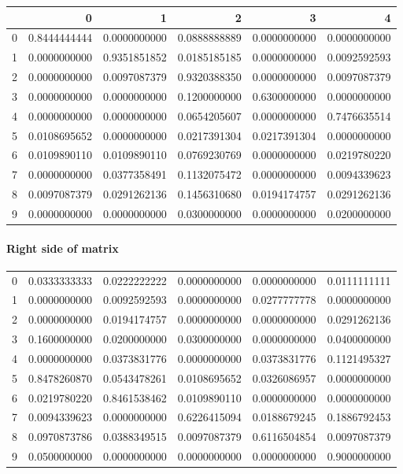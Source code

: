 \begin{tabular}{l|r|r|r|r|r}
 & 0 & 1 & 2 & 3 & 4 \\
\hline
0 & 0.8444444444 & 0.0000000000 & 0.0888888889 & 0.0000000000 & 0.0000000000 \\
1 & 0.0000000000 & 0.9351851852 & 0.0185185185 & 0.0000000000 & 0.0092592593 \\
2 & 0.0000000000 & 0.0097087379 & 0.9320388350 & 0.0000000000 & 0.0097087379 \\
3 & 0.0000000000 & 0.0000000000 & 0.1200000000 & 0.6300000000 & 0.0000000000 \\
4 & 0.0000000000 & 0.0000000000 & 0.0654205607 & 0.0000000000 & 0.7476635514 \\
5 & 0.0108695652 & 0.0000000000 & 0.0217391304 & 0.0217391304 & 0.0000000000 \\
6 & 0.0109890110 & 0.0109890110 & 0.0769230769 & 0.0000000000 & 0.0219780220 \\
7 & 0.0000000000 & 0.0377358491 & 0.1132075472 & 0.0000000000 & 0.0094339623 \\
8 & 0.0097087379 & 0.0291262136 & 0.1456310680 & 0.0194174757 & 0.0291262136 \\
9 & 0.0000000000 & 0.0000000000 & 0.0300000000 & 0.0000000000 & 0.0200000000 \\
\end{tabular}

\paragraph{Right side of matrix}

\begin{tabular}{l|r|r|r|r|r}
0 & 0.0333333333 & 0.0222222222 & 0.0000000000 & 0.0000000000 & 0.0111111111 \\
1 & 0.0000000000 & 0.0092592593 & 0.0000000000 & 0.0277777778 & 0.0000000000 \\
2 & 0.0000000000 & 0.0194174757 & 0.0000000000 & 0.0000000000 & 0.0291262136 \\
3 & 0.1600000000 & 0.0200000000 & 0.0300000000 & 0.0000000000 & 0.0400000000 \\
4 & 0.0000000000 & 0.0373831776 & 0.0000000000 & 0.0373831776 & 0.1121495327 \\
5 & 0.8478260870 & 0.0543478261 & 0.0108695652 & 0.0326086957 & 0.0000000000 \\
6 & 0.0219780220 & 0.8461538462 & 0.0109890110 & 0.0000000000 & 0.0000000000 \\
7 & 0.0094339623 & 0.0000000000 & 0.6226415094 & 0.0188679245 & 0.1886792453 \\
8 & 0.0970873786 & 0.0388349515 & 0.0097087379 & 0.6116504854 & 0.0097087379 \\
9 & 0.0500000000 & 0.0000000000 & 0.0000000000 & 0.0000000000 & 0.9000000000 \\
\end{tabular}


